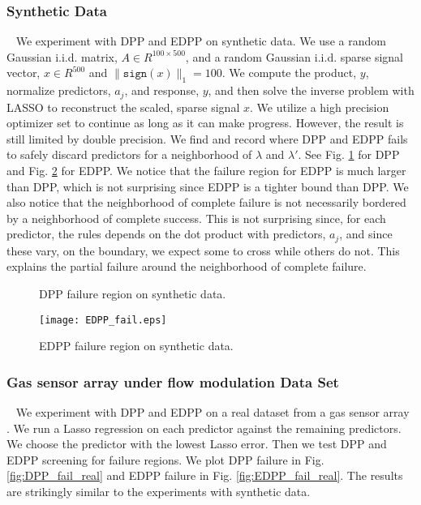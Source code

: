 \documentclass{article}
\begin{document}
\subsubsection*{Synthetic Data}

\qquad ~ We experiment with DPP and EDPP on synthetic data. We use a random Gaussian i.i.d. matrix, $A\in R^{100 \times 500}$, and a random Gaussian i.i.d. sparse signal vector, $x\in R^{500}$ and $\|\texttt{sign}(x)\|_1=100$. We compute the product, $y$, normalize predictors, $a_j$, and response, $y$, and then solve the inverse problem with LASSO to reconstruct the scaled, sparse signal $x$. We utilize a high precision optimizer set to continue as long as it can make progress. However, the result is still limited by double precision. We find and record where DPP and EDPP fails to safely discard predictors for a neighborhood of $\lambda$ and $\lambda'$. See Fig. \ref{fig:DPP_fail} for DPP and Fig. \ref{fig:EDPP_fail} for EDPP. We notice that the failure region for EDPP is much larger than DPP, which is not surprising since EDPP is a tighter bound than DPP. We also notice that the neighborhood of complete failure is not necessarily bordered by a neighborhood of complete success. This is not surprising since, for each predictor, the rules depends on the dot product with predictors, $a_j$, and since these vary, on the boundary, we expect some to cross while others do not. This explains the partial failure around the neighborhood of complete failure. 

\begin{figure}
    \centering
    \qquad
    \caption{DPP failure region on synthetic data.}
	\label{fig:DPP_fail}
\end{figure}

\begin{figure}
    \centering
    {\texttt{[image: EDPP\_fail.eps]} }
    \caption{EDPP failure region on synthetic data.}
	\label{fig:EDPP_fail}
\end{figure}


\subsubsection*{Gas sensor array under flow modulation Data Set}

\qquad ~ We experiment with DPP and EDPP on a real dataset from a gas sensor array \cite{bioinspired}. We run a Lasso regression on each predictor against the remaining predictors. We choose the predictor with the lowest Lasso error. Then we test DPP and EDPP screening for failure regions. We plot DPP failure in Fig. \ref{fig:DPP_fail_real} and EDPP failure in Fig. \ref{fig:EDPP_fail_real}. The results are strikingly similar to the experiments with synthetic data.
\end{document}
